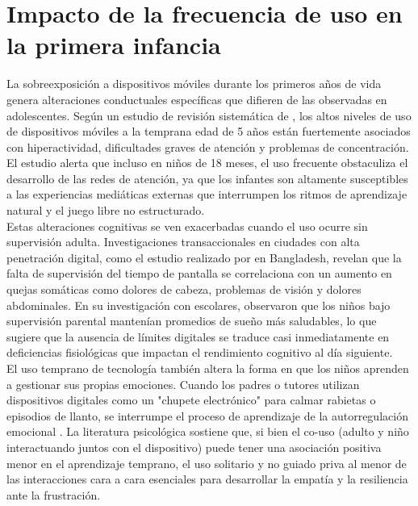 \section{Impacto de la frecuencia de uso en la primera infancia}

La sobreexposición a dispositivos móviles durante los primeros años de vida genera alteraciones conductuales específicas que difieren de las observadas en adolescentes. Según un estudio de revisión sistemática de \cite{pluas_frequent_2024}, los altos niveles de uso de dispositivos móviles a la temprana edad de 5 años están fuertemente asociados con hiperactividad, dificultades graves de atención y problemas de concentración. El estudio alerta que incluso en niños de 18 meses, el uso frecuente obstaculiza el desarrollo de las redes de atención, ya que los infantes son altamente susceptibles a las experiencias mediáticas externas que interrumpen los ritmos de aprendizaje natural y el juego libre no estructurado.\\

Estas alteraciones cognitivas se ven exacerbadas cuando el uso ocurre sin supervisión adulta. Investigaciones transaccionales en ciudades con alta penetración digital, como el estudio realizado por \cite{kakon_supervised_2025} en Bangladesh, revelan que la falta de supervisión del tiempo de pantalla se correlaciona con un aumento en quejas somáticas como dolores de cabeza, problemas de visión y dolores abdominales. En su investigación con escolares, observaron que los niños bajo supervisión parental mantenían promedios de sueño más saludables, lo que sugiere que la ausencia de límites digitales se traduce casi inmediatamente en deficiencias fisiológicas que impactan el rendimiento cognitivo al día siguiente.\\

El uso temprano de tecnología también altera la forma en que los niños aprenden a gestionar sus propias emociones. Cuando los padres o tutores utilizan dispositivos digitales como un "chupete electrónico" para calmar rabietas o episodios de llanto, se interrumpe el proceso de aprendizaje de la autorregulación emocional \cite{taylor_does_2024}. La literatura psicológica sostiene que, si bien el co-uso (adulto y niño interactuando juntos con el dispositivo) puede tener una asociación positiva menor en el aprendizaje temprano, el uso solitario y no guiado priva al menor de las interacciones cara a cara esenciales para desarrollar la empatía y la resiliencia ante la frustración. \\

